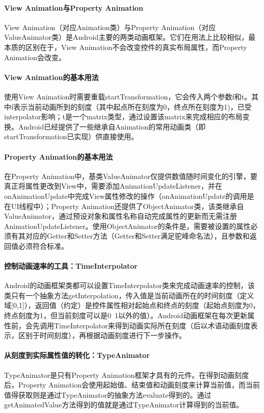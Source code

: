\documentclass[UTF8]{ctexart}
\begin{document}
    \paragraph{View Animation与Property Animation}
    View Animation（对应Animation类）与Property Animation（对应ValueAnimator类）是Android主要的两类动画框架。它们在用法上比较相似，最本质的区别在于，View Animation不会改变控件的真实布局属性，而Property Animation会改变。
    \paragraph{View Animation的基本用法}
    使用View Animation时需要重载startTransformation，它会传入两个参数f和t。其中f表示当前动画所到的刻度（其中起点所在刻度为0，终点所在刻度为1)，已受interpolator影响；t是一个matrix类型，通过设置该matrix来完成相应的布局变换。Android已经提供了一些继承自Animation的常用动画类（即startTransformation已实现）供直接使用。
    \paragraph{Property Animation的基本用法}
    在Property Animation中，基类ValueAnimator仅提供数值随时间变化的引擎，要真正将属性更改到View中，需要添加AnimationUpdateListener，并在onAnimationUpdate中完成View属性修改的操作（onAnimationUpdate的调用是在UI线程中）；Property Animation还提供了ObjectAnimator类，该类继承自ValueAnimator，通过预设对象和属性名称自动完成属性的更新而无需注册AnimationUpdateListener。使用ObjectAnimator的条件是，需要被设置的属性必须有其对应的Getter和Setter方法（Getter和Setter满足驼峰命名法），且参数和返回值必须符合标准。
    \paragraph{控制动画速率的工具：TimeInterpolator}
    Android的动画框架类都可以设置TimeInterpolator类来完成动画速率的控制，该类只有一个抽象方法getInterpolation，传入值是当前动画所在的时间刻度（定义域[0,1]），返回值（约定）是控件属性相对起始点和终点的刻度（起始点刻度为0，终点刻度为1，但当前刻度可以是0~1以外的值）。Android动画框架在每次更新属性前，会先调用TimeInterpolator来得到动画实际所在刻度（后以术语动画刻度表示，区别于时间刻度），再根据动画刻度进行下一步操作。
    \paragraph{从刻度到实际属性值的转化：TypeAnimator}
    TypeAnimator是只有Property Animation框架才具有的元件。在得到动画刻度后，Property Animation会使用起始值、结束值和动画刻度来计算当前值，而当前值得获取则是通过TypeAnimator的抽象方法evaluate得到的。通过getAnimatedValue方法得到的值就是通过TypeAnimator计算得到的当前值。
\end{document}
